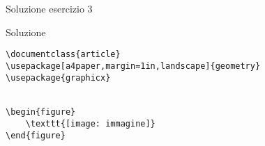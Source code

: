 \begin{frame}[fragile]{Soluzione esercizio 3}

\begin{block}{Soluzione}
\begin{lstlisting}
\documentclass{article}
\usepackage[a4paper,margin=1in,landscape]{geometry}
\usepackage{graphicx}


\begin{figure}
	\texttt{[image: immagine]}
\end{figure}


\end{lstlisting}
\end{block}

\end{frame}